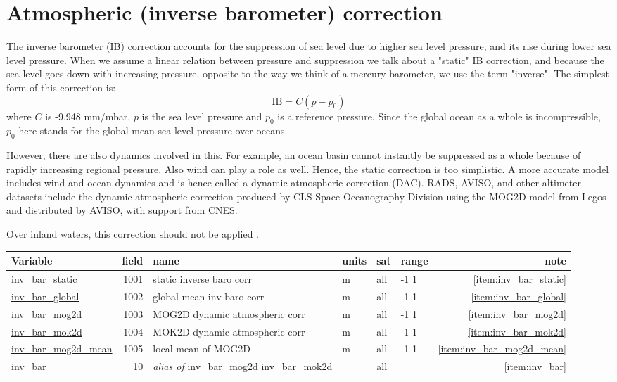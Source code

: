 \documentclass[a4paper,11pt,openany,natbib]{thesis}
\makeatletter
\newcommand\var[1]{\url{#1}\index{variables!#1@\protect\url{#1}}}
\newcommand\alias[1]{\emph{alias of} \var{#1}}
\newenvironment{vartable}{
\begin{table}[ht]
\small
\begin{tabular}{lrllllr}
\hline
Variable & field & name & units & sat & range & note \\
\hline
}{
\hline
\end{tabular}
\end{table}
}
\makeatother
\begin{document}
\section{Atmospheric (inverse barometer) correction}
The inverse barometer (IB) correction accounts for the suppression of sea level due to higher sea level pressure, and its rise during lower sea level pressure. When we assume a linear relation between pressure and suppression we talk about a "static" IB correction, and because the sea level goes down with increasing pressure, opposite to the way we think of a mercury barometer, we use the term "inverse". The simplest form of this correction is:
$$ \mathrm{IB} = C (p - p_0) $$
where $C$ is -9.948 mm/mbar, $p$ is the sea level pressure and $p_0$ is a reference pressure. Since the global ocean as a whole is incompressible, $p_0$ here stands for the global mean sea level pressure over oceans.

However, there are also dynamics involved in this. For example, an ocean basin cannot instantly be suppressed as a whole because of rapidly increasing regional pressure. Also wind can play a role as well. Hence, the static correction is too simplistic. A more accurate model includes wind and ocean dynamics and is hence called a dynamic atmospheric correction (DAC). RADS, AVISO, and other altimeter datasets include the dynamic atmospheric correction produced by CLS Space Oceanography Division using the MOG2D model from Legos \citep{carrere2003,roblou2008a} and distributed by AVISO, with support from CNES.

Over inland waters, this correction should not be applied \citep{cretaux2006}.

\begin{vartable}
\var{inv_bar_static} & 1001 & static inverse baro corr & m & all & -1 1 & \ref{item:inv_bar_static} \\
\var{inv_bar_global} & 1002 & global mean inv baro corr & m & all & -1 1 & \ref{item:inv_bar_global} \\
\var{inv_bar_mog2d}  & 1003 & MOG2D dynamic atmospheric corr & m & all & -1 1 & \ref{item:inv_bar_mog2d} \\
\var{inv_bar_mok2d}  & 1004 & MOK2D dynamic atmospheric corr & m & all & -1 1 & \ref{item:inv_bar_mok2d} \\
\var{inv_bar_mog2d_mean} & 1005 & local mean of MOG2D & m & all & -1 1 & \ref{item:inv_bar_mog2d_mean} \\
\hline
\var{inv_bar} & 10 & \alias{inv_bar_mog2d} \var{inv_bar_mok2d} & & all & & \ref{item:inv_bar} \\
\end{vartable}
\end{document}
